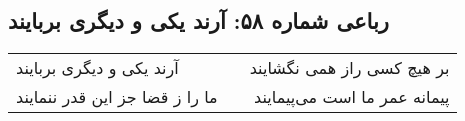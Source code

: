 \begin{center}
\section*{رباعی شماره ۵۸: آرند یکی و دیگری بربایند}
\label{sec:sh058}
\begin{longtable}{l p{0.5cm} r}
آرند یکی و دیگری بربایند
&&
بر هیچ کسی راز همی نگشایند
\\
ما را ز قضا جز این قدر ننمایند
&&
پیمانه عمر ما است می‌پیمایند
\\
\end{longtable}
\end{center}
